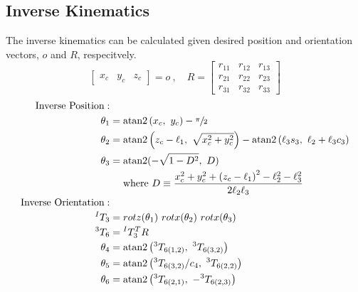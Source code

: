 \subsection{Inverse Kinematics}
The inverse kinematics can be calculated given desired position and orientation vectors, $o$ and $R$, respecitvely.
\[
\begin{bmatrix}x_c & y_c & z_c \end{bmatrix} = o~,\quad
  R =
  \begin{bmatrix}
    r_{11} & r_{12} & r_{13} \\
    r_{21} & r_{22} & r_{23} \\
    r_{31} & r_{32} & r_{33}
  \end{bmatrix}
\]
\begin{equation}
\begin{aligned}
\quad\text{Inverse Position}: \\
\theta_{1}&= \text{atan2} \left(x_{c},~ y_{c}\right) - \sfrac{\pi}{2}\\
\theta_{2}&= \text{atan2} \left(z_c - \ell_1, ~\sqrt{x_c^2 + y_c^2}\right) - \text{atan2}\left(\ell_3s_3,~\ell_2 + \ell_3c_3\right) \\
\theta_{3}&= \text{atan2} (-\sqrt{1-D^{2}},~ D) \\
& \quad \text { where } D\equiv\frac{x_{c}^{2}+y_{c}^{2}+\left(z_{c}-\ell_{1}\right)^{2}-\ell_{2}^{2}-\ell_{3}^{2}}{2 \ell_{2} \ell_{3}} \\
\quad\text{Inverse Orientation}:\\
^IT_3 &= rotz(\theta_1)~rotx(\theta_2)~rotx(\theta_3) \\
{}^3T_6 &= {}^IT_3^TR \\ %
\theta_4 &= \text{atan2} \left({}^3T_{6(1,2)},~{}^3T_{6(3,2)}\right) \\
\theta_5 &= \text{atan2} \left({{}^3T_{6(3,2)}} / {c_4},~{}^3T_{6(2,2)}\right) \\
\theta_6 &= \text{atan2} \left({}^3T_{6(2,1)},~ -{}^3T_{6(2,3)}\right) \\
\end{aligned}
\nonumber
\end{equation}

